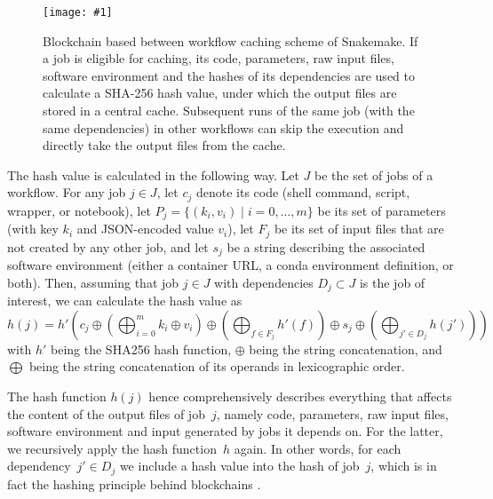 \documentclass[parskip=half]{scrartcl}
\newcommand{\image}[1]{\centering\texttt{[image: \#1]}}
\begin{document}
\begin{figure}
	\image{caching.pdf}
	\caption{
		Blockchain based between workflow caching scheme of Snakemake.
		If a job is eligible for caching, its code, parameters, raw input files, software environment and the hashes of its dependencies are used to calculate a SHA-256 hash value, under which the output files are stored in a central cache.
		Subsequent runs of the same job (with the same dependencies) in other workflows can skip the execution and directly take the output files from the cache.
	}
	\label{fig:caching}
\end{figure}

The hash value is calculated in the following way.
Let $J$ be the set of jobs of a workflow.
For any job $j \in J$, let $c_j$ denote its code (shell command, script, wrapper, or notebook), let $P_j = \{(k_i, v_i) \mid i=0,\dots,m\}$ be its set of parameters (with key $k_i$ and JSON-encoded value $v_i$), let $F_j$ be its set of input files that are not created by any other job, and let $s_j$ be a string describing the associated software environment (either a container URL, a conda environment definition, or both).
Then, assuming that job $j \in J$ with dependencies $D_j \subset J$ is the job of interest, we can calculate the hash value as $$ h(j) = h'\left( c_j \oplus \left(\bigoplus_{i=0}^m k_i \oplus v_i \right) \oplus \left( \bigoplus_{f \in F_j} h'(f) \right) \oplus s_j \oplus \left( \bigoplus_{j' \in D_j} h(j') \right) \right) $$ with $h'$ being the SHA256 \parencite{Handschuh} hash function, $\oplus$ being the string concatenation, and $\bigoplus$ being the string concatenation of its operands in lexicographic order.

The hash function $h(j)$ hence comprehensively describes everything that affects the content of the output files of job~\(j\), namely code, parameters, raw input files, software environment and input generated by jobs it depends on.
For the latter, we recursively apply the hash function~\(h\) again.
In other words, for each dependency~\(j' \in D_j\) we include a hash value into the hash of job~\(j\), which is in fact the hashing principle behind blockchains \parencite{narayanan_bitcoin_2016}.

\printbibliography
\end{document}
